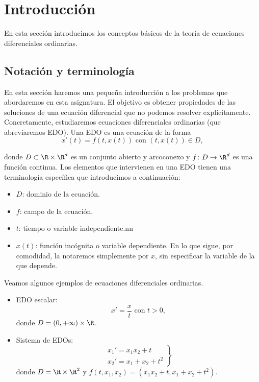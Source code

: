 \documentclass{article}
\begin{document}
\maketitle

\section{Introducción}

En esta sección introducimos los conceptos básicos de la teoría de ecuaciones diferenciales ordinarias.

\subsection{Notación y terminología}

En esta sección haremos una pequeña introducción a los problemas que abordaremos en esta
asignatura. El objetivo es obtener propiedades de las soluciones de una ecuación diferencial que no
podemos resolver explícitamente. Concretamente, estudiaremos ecuaciones diferenciales ordinarias
(que abreviaremos EDO). Una EDO es una ecuación de la forma
\begin{equation}
  \label{eq:edo}
  x'(t) = f(t,x(t)) \text{ con } (t,x(t)) \in D,
  \tag{E}
\end{equation}

donde $D \subset \R \times \R^d$ es un conjunto abierto y arcoconexo y $f\colon D \to \R^d$ es una
función continua. Los elementos que intervienen en una EDO tienen una terminología específica que
introducimos a continuación:

\begin{itemize}
\item $D$: dominio de la ecuación.
\item $f$: campo de la ecuación.
\item $t$: tiempo o variable independiente.nn
\item $x(t)$: función incógnita o variable dependiente. En lo que sigue, por comodidad, la notaremos
  simplemente por $x$, sin especificar la variable de la que depende.
\end{itemize}

\begin{ex} \label{ex:ex} Veamos algunos ejemplos de ecuaciones diferenciales ordinarias.
  
  \begin{itemize}
  \item EDO escalar:
    \[x' = \frac{x}{t} \text{ con } t > 0,\] donde $D = (0, +\infty) \times \R$.
  \item Sistema de EDOs:
    \[
      \left.
        \begin{array}{r}
          x_1' = x_1x_2 + t \\
          x_2' = x_1 + x_2 + t^2
        \end{array}
      \right\}
    \]
    donde $D = \R \times \R^2$ y $f(t, x_1, x_2) = (x_1x_2 + t, x_1 + x_2 + t^2)$. \qedhere
  \end{itemize}
\end{ex}
\end{document}
